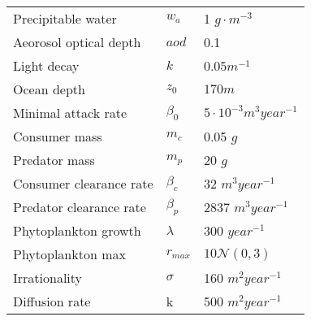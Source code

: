 \begin{tabular}{l | l | l}
  Precipitable water & $w_a$ & 1 $g \cdot m^{-3}$\\
  Aeorosol optical depth & $aod$ & 0.1 \\
  Light decay & $k$ & $0.05 m^{-1}$\\
  Ocean depth & $z_0$ & $170 m$ \\
  Minimal attack rate & $\beta_0$ & $5 \cdot 10^{-3} m^{3} year^{-1}$ \\
  Consumer mass & $m_c$ & 0.05 $g$ \\
  Predator mass & $m_p$ & 20 $g$ \\
  Consumer clearance rate & $\beta_c$ & 32 $m^{3} year^{-1}$ \\
  Predator clearance rate & $\beta_p$ & 2837 $m^3 year^{-1}$ \\
  Phytoplankton growth & $\lambda$ & 300 $year^{-1}$ \\
  Phytoplankton max & $r_{max}$ & $10\mathcal{N}(0,3)$ \\
  Irrationality & $\sigma$ & 160 $m^2 year^{-1}$ \\
  Diffusion rate & k & 500 $m^{2} year^{-1}$
\end{tabular}
